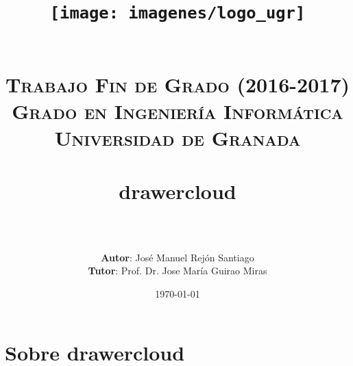 



\title{	
\begin{figure}[h]
	\centering
	\texttt{[image: imagenes/logo\_ugr]}
\end{figure}
\normalfont \normalsize
\textsc{{ \\ \bf Trabajo Fin de Grado (2016-2017)} \\ Grado en Ingeniería Informática \\ Universidad de Granada} \\ [25pt] %
\horrule{0.5pt} \\[0.4cm] %
\huge drawercloud \\ %
\horrule{2pt} \\[0.5cm] %
}

\author{\textbf{Autor}: José Manuel Rejón Santiago \\ \textbf{Tutor}: Prof. Dr. Jose María Guirao Miras} %

\date{\normalsize\today} %





\maketitle %

\newpage %

\tableofcontents %

\listoffigures

\listoftables

\newpage

\section{Sobre drawercloud}
